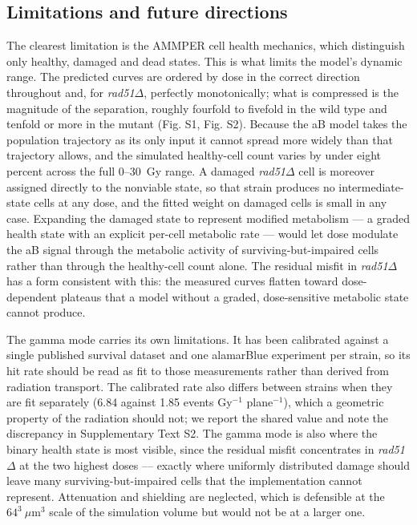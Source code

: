\documentclass{asmarticle}
\begin{document}
\subsection{Limitations and future directions}
The clearest limitation is the AMMPER cell health mechanics, which distinguish only healthy, damaged and dead states. This is what limits the model's dynamic range. The predicted curves are ordered by dose in the correct direction throughout and, for \textit{rad51}$\Delta$, perfectly monotonically; what is compressed is the magnitude of the separation, roughly fourfold to fivefold in the wild type and tenfold or more in the mutant (Fig. S1, Fig. S2). Because the aB model takes the population trajectory as its only input it cannot spread more widely than that trajectory allows, and the simulated healthy-cell count varies by under eight percent across the full 0--30~Gy range. A damaged \textit{rad51}$\Delta$ cell is moreover assigned directly to the nonviable state, so that strain produces no intermediate-state cells at any dose, and the fitted weight on damaged cells is small in any case. Expanding the damaged state to represent modified metabolism --- a graded health state with an explicit per-cell metabolic rate --- would let dose modulate the aB signal through the metabolic activity of surviving-but-impaired cells rather than through the healthy-cell count alone. The residual misfit in \textit{rad51}$\Delta$ has a form consistent with this: the measured curves flatten toward dose-dependent plateaus that a model without a graded, dose-sensitive metabolic state cannot produce.

The gamma mode carries its own limitations. It has been calibrated against a single published survival dataset \cite{brennan2001persistent} and one alamarBlue experiment per strain, so its hit rate should be read as fit to those measurements rather than derived from radiation transport. The calibrated rate also differs between strains when they are fit separately (6.84 against 1.85 events Gy$^{-1}$ plane$^{-1}$), which a geometric property of the radiation should not; we report the shared value and note the discrepancy in Supplementary Text S2. The gamma mode is also where the binary health state is most visible, since the residual misfit concentrates in \textit{rad51}$\Delta$ at the two highest doses --- exactly where uniformly distributed damage should leave many surviving-but-impaired cells that the implementation cannot represent. Attenuation and shielding are neglected, which is defensible at the $64^3~\mu\mathrm{m}^3$ scale of the simulation volume but would not be at a larger one.
\end{document}
